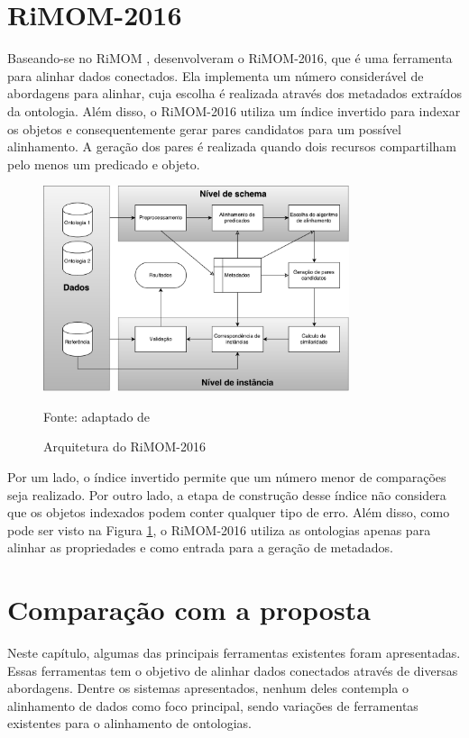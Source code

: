 \section{RiMOM-2016}
Baseando-se no RiMOM  \cite{li2009rimom},  desenvolveram o RiMOM-2016, que é uma ferramenta para alinhar dados conectados. Ela implementa um número considerável de abordagens para alinhar, cuja escolha é realizada através dos metadados extraídos da ontologia. Além disso, o RiMOM-2016 utiliza um índice invertido para indexar os objetos e consequentemente gerar pares candidatos para um possível alinhamento. A geração dos pares é realizada quando dois recursos compartilham pelo menos um predicado e objeto.

\begin{figure}[!ht]
	\centering
	\includegraphics[width=0.8\textwidth]{./imagens/rimom_2016.pdf}
    \caption{Arquitetura do RiMOM-2016}
	\footnotesize{Fonte: adaptado de \cite{zhang2016rimom}}
	\label{fig:rimom}
\end{figure}

Por um lado, o índice invertido permite que um número menor de comparações seja realizado. Por outro lado, a etapa de construção desse índice não considera que os objetos indexados podem conter qualquer tipo de erro. Além disso, como pode ser visto na Figura \ref{fig:rimom}, o RiMOM-2016 utiliza as ontologias apenas para alinhar as propriedades e como entrada para a geração de metadados.

\section{Comparação com a proposta}

Neste capítulo, algumas das principais ferramentas existentes foram apresentadas. Essas ferramentas tem o objetivo de alinhar dados conectados através de diversas abordagens. Dentre os sistemas apresentados, nenhum deles contempla o alinhamento de dados como foco principal, sendo variações de ferramentas existentes para o alinhamento de ontologias.
% 
% 

